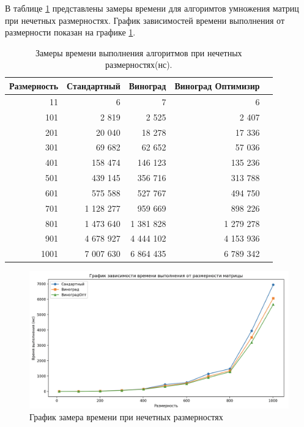 \clearpage

В таблице \ref{tab:time2} представлены замеры времени для алгоримтов 
умножения матриц при нечетных размерностях. График зависимостей времени выполнения от размерности показан 
на графике \ref{img:dem2}.

\begin{table}[!ht]
    \centering
    \caption{\label{tab:time2}Замеры времени выполнения алгоритмов при нечетных размерностях(нс).}
    \begin{tabular}{|r|r|r|r|r|}
    \hline
        Размерность & Стандартный & Виноград & Виноград Оптимизир   \\ \hline
        11 & 6 & 7 & 6   \\ \hline
        101 & 2 819 & 2 525 & 2 407   \\ \hline
        201 & 20 040 & 18 278 & 17 336   \\ \hline
        301 & 69 682 & 62 652 & 57 036   \\ \hline
        401 & 158 474 & 146 123 & 135 236   \\ \hline
        501 & 439 145 & 356 716 & 313 788   \\ \hline
        601 & 575 588 & 527 767 & 494 750   \\ \hline
        701 & 1 128 277 & 959 669 & 898 226   \\ \hline
        801 & 1 473 640 & 1 381 828 & 1 279 278   \\ \hline
        901 & 4 678 927 & 4 444 102 & 4 153 936   \\ \hline
        1001 & 7 007 630 & 6 864 435 & 6 789 342  \\ \hline
    \end{tabular}
\end{table}

\begin{figure}[h]
	\centering
	\includegraphics[height=0.35\textheight]{img/graph123.png}
	\caption{График замера времени при нечетных размерностях}
	\label{img:dem2}
\end{figure}


